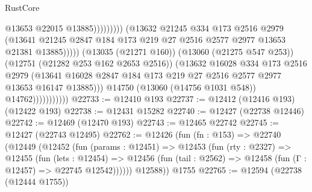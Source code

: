 \begin{lexlean}{RustCore}
\begin{coremodule}
                                                    @13653
                                                    @22015
                                                    @13885)))))))))
                                  (@13632
                                    @21245
                                    @334
                                    @173
                                    @2516
                                    @2979
                                    (@13641
                                      @21245
                                      @2847
                                      @184
                                      @173
                                      @219
                                      @27
                                      @2516
                                      @2577
                                      @2977
                                      @13653
                                      @21381
                                      @13885)))))
                            (@13035 (@21271 @160))
                            (@13060 (@21275 @547 @253))
                            (@12751 (@21282 @253 @162 @2653 @2516))
                            (@13632
                              @16028
                              @334
                              @173
                              @2516
                              @2979
                              (@13641
                                @16028
                                @2847
                                @184
                                @173
                                @219
                                @27
                                @2516
                                @2577
                                @2977
                                @13653
                                @16147
                                @13885)))
                          @14750
                          (@13060 (@14756 @1031 @548))
                          @14762)))))))))))
@22733 := @12410 @193
@22737 := @12412 (@12416 @193) (@12422 @193)
@22738 := @12431 @15282
@22740 := @12427 (@22738 @12446)
@22742 := @12469 (@12470 @193)
@22743 := @12465 @22742
@22745 := @12427 (@22743 @12495)
@22762 := @12426
    (fun (fn : @153) =>
    @22740
      (@12449
        (@12452
          (fun (params : @12451) =>
          @12453
            (fun (rty : @2327) =>
            @12455
              (fun (lets : @12454) =>
              @12456 (fun (tail : @2562) => @12458 (fun (Γ : @12457) => @22745 @12542))))))
        @12588))
    @1755
@22765 := @12594 (@22738 (@12444 @1755))

\end{coremodule}
\end{lexlean}

